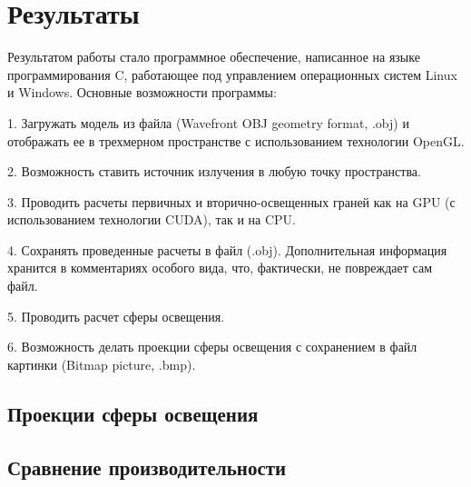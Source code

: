 \newpage
\section*{Результаты} 

Результатом работы стало программное обеспечение, написанное на языке программирования C, работающее под управлением операционных систем Linux и Windows. Основные возможности программы:

1. Загружать модель из файла (Wavefront OBJ geometry format, .obj) и отображать ее в трехмерном пространстве с использованием технологии OpenGL.

2. Возможность ставить источник излучения в любую точку пространства.

3. Проводить расчеты первичных и вторично-освещенных граней как на GPU (с использованием технологии CUDA), так и на CPU.

4. Сохранять проведенные расчеты в файл (.obj). Дополнительная информация хранится в комментариях особого вида, что, фактически, не повреждает сам файл.

5. Проводить расчет сферы освещения.

6. Возможность делать проекции сферы освещения с сохранением в файл картинки (Bitmap picture, .bmp).

\subsection*{Проекции сферы освещения}



\subsection*{Сравнение производительности}
